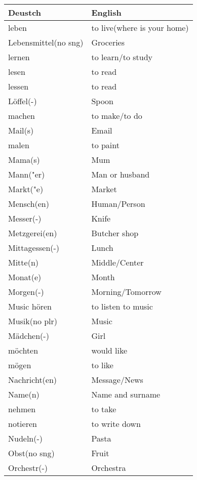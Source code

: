 \documentclass{article}
\renewcommand{\arraystretch}{1}
\begin{document}
\begin{minipage}{0.48\textwidth}
    \centering
    \renewcommand{\arraystretch}{1.5}
    \begin{tabular}{|>{\raggedright\arraybackslash}p{3.5cm}|>{\raggedright\arraybackslash}p{3.5cm}|}
        \hline
        \rowcolor{gray!20} \textbf{Deustch} & \textbf{English} \\
        \hline
        leben & to live(where is your home) \\\hline
        Lebensmittel(no sng) & Groceries \\\hline
        lernen & to learn/to study \\\hline
        lesen & to read \\\hline
        lessen & to read \\\hline
        Löffel(-) & Spoon \\\hline
        machen & to make/to do \\\hline
        Mail(s) & Email \\\hline
        malen & to paint \\\hline
        Mama(s) & Mum \\\hline
        Mann("er) & Man or husband \\\hline
        Markt("e) & Market \\\hline
        Mensch(en) & Human/Person \\\hline
        Messer(-) & Knife \\\hline
        Metzgerei(en) & Butcher shop \\\hline
        Mittagessen(-) & Lunch \\\hline
        Mitte(n) & Middle/Center \\\hline
        Monat(e) & Month \\\hline
        Morgen(-) & Morning/Tomorrow \\\hline
        Music hören & to listen to music \\\hline
        Musik(no plr) & Music \\\hline
        Mädchen(-) & Girl \\\hline
        möchten & would like \\\hline
        mögen & to like \\\hline
        Nachricht(en) & Message/News \\\hline
        Name(n) & Name and surname \\\hline
        nehmen &  to take \\\hline
        notieren & to write down \\\hline
        Nudeln(-) & Pasta \\\hline
        Obst(no sng) & Fruit \\\hline
        Orchestr(-) & Orchestra \\\hline
    \end{tabular}
\end{minipage}
\end{document}

